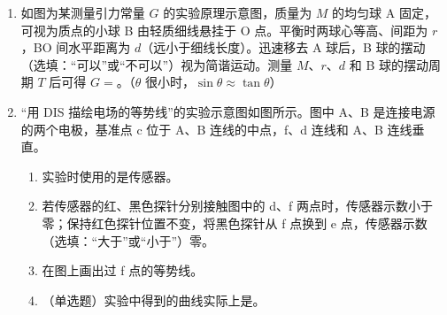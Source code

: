 \documentclass[\gkver]{gaokaozhenti}
\begin{document}
\begin{enumerate}
{（2）$\alpha\left(\frac{CT}{M}\right)^{\lambda}$ 的单位可以表示为 $[\mathrm{kg}\cdot\mathrm{m}^{2}\cdot\mathrm{s}^{-2}\cdot\mathrm{K}^{-1}\cdot\mathrm{mol}^{-1}][\mathrm{K}][\mathrm{kg}^{-1}\cdot\mathrm{mol}]=[\mathrm{m}^{2}\cdot\mathrm{s}^{-2}]$，而速度 $v$ 的单位可以表示为 $[\mathrm{m}\cdot\mathrm{s}^{-1}]$，比较两者可知 $\lambda=0.5$。
}

\item
如图为某测量引力常量 $G$ 的实验原理示意图，质量为 $M$ 的均匀球 A 固定，可视为质点的小球 B 由轻质细线悬挂于 O 点。平衡时两球心等高、间距为 $r$，BO 间水平距离为 $d$（远小于细线长度）。迅速移去 A 球后，B 球的摆动（选填：“可以”或“不可以”）视为简谐运动。测量 $M$、$r$、$d$ 和 B 球的摆动周期 $T$ 后可得 $G=$。（$\theta$ 很小时，$\sin\theta\approx\tan\theta$）
\onepicture[align=right, h=3.60cm]{}

\item
“用 DIS 描绘电场的等势线”的实验示意图如图所示。图中 A、B 是连接电源的两个电极，基准点 c 位于 A、B 连线的中点，f、d 连线和 A、B 连线垂直。
\begin{enumerate}
	\item
	实验时使用的是传感器。
	\item
	若传感器的红、黑色探针分别接触图中的 d、f 两点时，传感器示数小于零；保持红色探针位置不变，将黑色探针从 f 点换到 e 点，传感器示数（选填：“大于”或“小于”）零。
	\item
	在图上画出过 f 点的等势线。
	\item
	（单选题）实验中得到的曲线实际上是。


\end{enumerate}
\end{enumerate}
\end{document}
